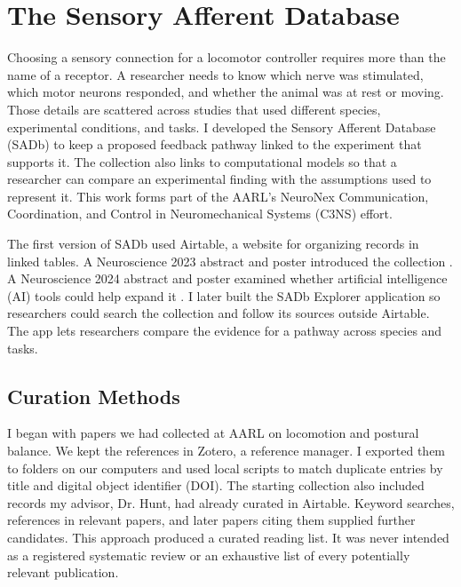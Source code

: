 \chapter{The Sensory Afferent Database}\label{ch:database}
\graphicspath{{../Figures/50-database/}{figs/50-database/}}

Choosing a sensory connection for a locomotor controller requires more than the name of a receptor. A researcher needs to know which nerve was stimulated, which motor neurons responded, and whether the animal was at rest or moving. Those details are scattered across studies that used different species, experimental conditions, and tasks. I developed the Sensory Afferent Database (SADb) to keep a proposed feedback pathway linked to the experiment that supports it. The collection also links to computational models so that a researcher can compare an experimental finding with the assumptions used to represent it. This work forms part of the AARL's NeuroNex Communication, Coordination, and Control in Neuromechanical Systems (C3NS) effort.

The first version of SADb used Airtable, a website for organizing records in linked tables. A Neuroscience 2023 abstract and poster introduced the collection \citep{bolen_sensory_2023}. A Neuroscience 2024 abstract and poster examined whether artificial intelligence (AI) tools could help expand it \citep{bolen_using_2024}. I later built the SADb Explorer application so researchers could search the collection and follow its sources outside Airtable. The app lets researchers compare the evidence for a pathway across species and tasks.

\section{Curation Methods}\label{sec:sadb_methods}

I began with papers we had collected at AARL on locomotion and postural balance. We kept the references in Zotero, a reference manager. I exported them to folders on our computers and used local scripts to match duplicate entries by title and digital object identifier (DOI). The starting collection also included records my advisor, Dr. Hunt, had already curated in Airtable. Keyword searches, references in relevant papers, and later papers citing them supplied further candidates. This approach produced a curated reading list. It was never intended as a registered systematic review or an exhaustive list of every potentially relevant publication.

